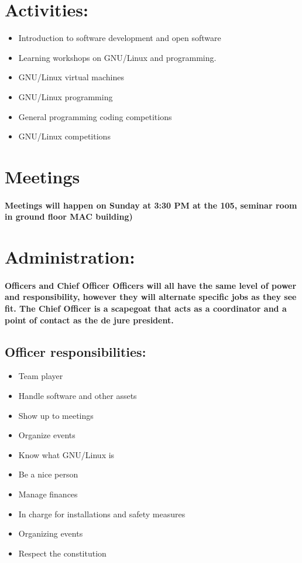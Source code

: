 \documentclass[a4paper, 11pt]{amsart}
\begin{document}
\section{Activities:}
\begin{itemize}
    \item Introduction to software development and open software
  \item Learning workshops on GNU/Linux and programming.
  \item GNU/Linux virtual machines
  \item GNU/Linux programming
  \item General programming coding competitions
  \item GNU/Linux competitions
\end{itemize}




\section{Meetings}
\paragraph{Meetings will happen on Sunday at 3:30 PM at the 105, seminar room in ground floor MAC building)}




\section{Administration:}
\paragraph{Officers and Chief Officer
	Officers will all have the same level of power and responsibility, however they will alternate specific jobs as they see fit.
	The Chief Officer is a scapegoat that acts as a coordinator and a point of contact as the de jure president.
}
\subsection{Officer responsibilities:}
\begin{itemize}
    \item Team player
    \item Handle software and other assets
    \item Show up to meetings
    \item Organize events
    \item Know what GNU/Linux is
    \item Be a nice person
    \item Manage finances
    \item In charge for installations and safety measures
    \item  Organizing events
    \item Respect the constitution
\end{itemize}
\end{document}
